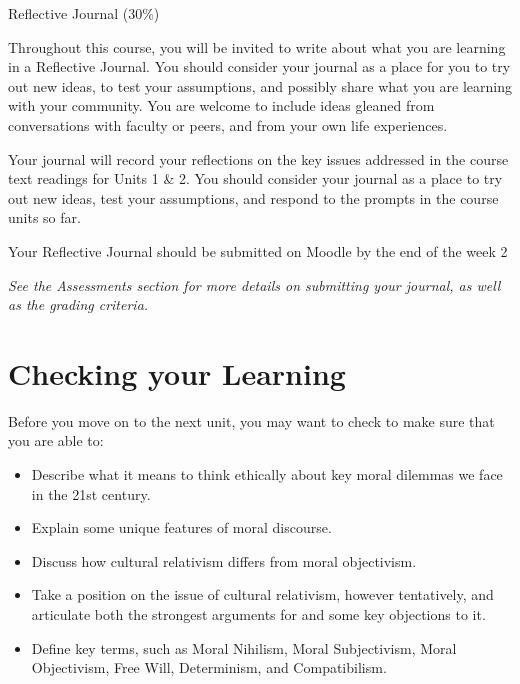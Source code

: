 \documentclass[
]{book}
\providecommand{\tightlist}{%
  \setlength{\itemsep}{0pt}\setlength{\parskip}{0pt}}
\begin{document}
\begin{assessment}
{Reflective Journal (30\%)}

Throughout this course, you will be invited to write about what you are learning in a Reflective Journal. You should consider your journal as a place for you to try out new ideas, to test your assumptions, and possibly share what you are learning with your community. You are welcome to include ideas gleaned from conversations with faculty or peers, and from your own life experiences.

Your journal will record your reflections on the key issues addressed in the course text readings for Units 1 \& 2. You should consider your journal as a place to try out new ideas, test your assumptions, and respond to the prompts in the course units so far.

Your Reflective Journal should be submitted on Moodle by the end of the week 2

\emph{See the Assessments section for more details on submitting your journal, as well as the grading criteria.}
\end{assessment}

\hypertarget{checking-your-learning}{%
\section*{Checking your Learning}\label{checking-your-learning}}

\begin{progress}
Before you move on to the next unit, you may want to check to make sure that you are able to:

\begin{itemize}
\tightlist
\item
  Describe what it means to think ethically about key moral dilemmas we face in the 21st century.
\item
  Explain some unique features of moral discourse.
\item
  Discuss how cultural relativism differs from moral objectivism.
\item
  Take a position on the issue of cultural relativism, however tentatively, and articulate both the strongest arguments for and some key objections to it.
\item
  Define key terms, such as Moral Nihilism, Moral Subjectivism, Moral Objectivism, Free Will, Determinism, and Compatibilism.
\end{itemize}
\end{progress}
\end{document}
